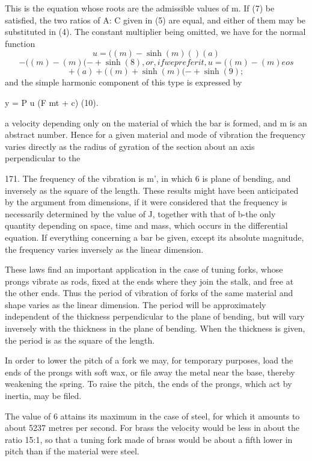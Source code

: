 This is the equation whose roots are the admissible values of m. If (7)
be satisfied, the two ratios of A: C given in (5) are equal, and either
of them may be substituted in (4). The constant multiplier being
omitted, we have for the normal function
\[ u = ( (m) - \sinh(m) () (a) \]
\[ - ( (m) - (m) (- + \sinh(8), or, if we prefer it, u = ( (m) - (m) eos \]
\[ + (a) + ( (m) + \sinh(m) (- + \sinh(9); \]
and the simple harmonic component of this type is expressed by

y = P u (F mt + c) (10).

a velocity depending only on the material of which the bar is formed,
and m is an abstract number. Hence for a given material and mode of
vibration the frequency varies directly as the radius of gyration of
the section about an axis perpendicular to the

171. The frequency of the vibration is m', in which 6 is plane of
bending, and inversely as the square of the length. These results might
have been anticipated by the argument from dimensions, if it were
considered that the frequency is necessarily determined by the value of
J, together with that of b-the only quantity depending on space, time
and mass, which occurs in the differential equation. If everything
concerning a bar be given, except its absolute magnitude, the frequency
varies inversely as the linear dimension.

These laws find an important application in the case of tuning forks,
whose prongs vibrate as rods, fixed at the ends where they join the
stalk, and free at the other ends. Thus the period of vibration of forks
of the same material and shape varies as the linear dimension. The
period will be approximately independent of the thickness perpendicular
to the plane of bending, but will vary inversely with the thickness in
the plane of bending. When the thickness is given, the period is as the
square of the length.

In order to lower the pitch of a fork we may, for temporary purposes,
load the ends of the prongs with soft wax, or file away the metal near
the base, thereby weakening the spring. To raise the pitch, the ends of
the prongs, which act by inertia, may be filed.

The value of 6 attains its maximum in the case of steel, for which it
amounts to about 5237 metres per second. For brass the velocity would be
less in about the ratio 15:1, so that a tuning fork made of brass would
be about a fifth lower in pitch than if the material were steel.

